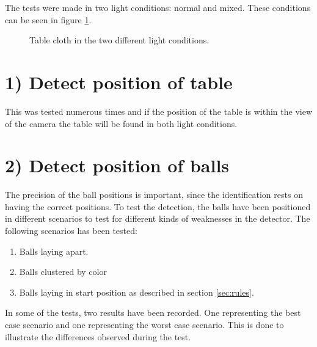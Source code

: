 The tests were made in two light conditions: normal and mixed. These conditions can be seen in figure \ref{fig:difflightcon}.

\begin{figure}[H]
  \centering
  \quad           
   \caption{Table cloth in the two different light conditions.}
  \label{fig:difflightcon}
\end{figure}


\section{1) Detect position of table}

This was tested numerous times and if the position of the table is within the view of the camera the table will be found in both light conditions.

\section{2) Detect position of balls}
The precision of the ball positions is important, since the identification rests on having the correct positions. To test the detection, the balls have been positioned in different scenarios to test for different kinds of weaknesses in the detector. The following scenarios has been tested:
\begin{enumerate}
	\item Balls laying apart.
	\item Balls clustered by color
	\item Balls laying in start position as described in section \ref{sec:rules}.
\end{enumerate}
In some of the tests, two results have been recorded. One representing the best case scenario and one representing the worst case scenario. This is done to illustrate the differences observed during the test.


